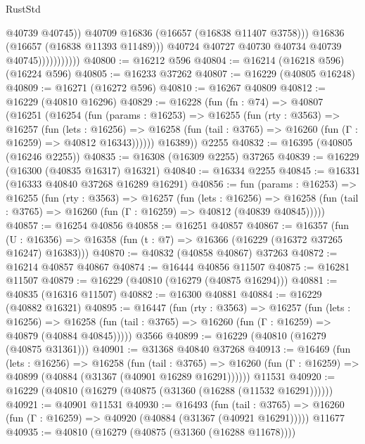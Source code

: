 \begin{lexlean}{RustStd}
\begin{coremodule}
                                  @40739
                                  @40745))
                              @40709
                              @16836
                              (@16657 (@16838 @11407 @3758)))
                            @16836
                            (@16657 (@16838 @11393 @11489)))
                          @40724
                          @40727
                          @40730
                          @40734
                          @40739
                          @40745)))))))))))
@40800 := @16212 @596
@40804 := @16214 (@16218 @596) (@16224 @596)
@40805 := @16233 @37262
@40807 := @16229 (@40805 @16248)
@40809 := @16271 (@16272 @596)
@40810 := @16267 @40809
@40812 := @16229 (@40810 @16296)
@40829 := @16228
    (fun (fn : @74) =>
    @40807
      (@16251
        (@16254
          (fun (params : @16253) =>
          @16255
            (fun (rty : @3563) =>
            @16257
              (fun (lets : @16256) =>
              @16258 (fun (tail : @3765) => @16260 (fun (Γ : @16259) => @40812 @16343))))))
        @16389))
    @2255
@40832 := @16395 (@40805 (@16246 @2255))
@40835 := @16308 (@16309 @2255) @37265
@40839 := @16229 (@16300 (@40835 @16317) @16321)
@40840 := @16334 @2255
@40845 := @16331 (@16333 @40840 @37268 @16289 @16291)
@40856 := fun (params : @16253) =>
  @16255
    (fun (rty : @3563) =>
    @16257
      (fun (lets : @16256) =>
      @16258 (fun (tail : @3765) => @16260 (fun (Γ : @16259) => @40812 (@40839 @40845)))))
@40857 := @16254 @40856
@40858 := @16251 @40857
@40867 := @16357
    (fun (U : @16356) => @16358 (fun (t : @7) => @16366 (@16229 (@16372 @37265 @16247) @16383)))
@40870 := @40832 (@40858 @40867) @37263
@40872 := @16214 @40857 @40867
@40874 := @16444 @40856 @11507
@40875 := @16281 @11507
@40879 := @16229 (@40810 (@16279 (@40875 @16294)))
@40881 := @40835 (@16316 @11507)
@40882 := @16300 @40881
@40884 := @16229 (@40882 @16321)
@40895 := @16447
    (fun (rty : @3563) =>
    @16257
      (fun (lets : @16256) =>
      @16258 (fun (tail : @3765) => @16260 (fun (Γ : @16259) => @40879 (@40884 @40845)))))
    @3566
@40899 := @16229 (@40810 (@16279 (@40875 @31361)))
@40901 := @31368 @40840 @37268
@40913 := @16469
    (fun (lets : @16256) =>
    @16258
      (fun (tail : @3765) =>
      @16260 (fun (Γ : @16259) => @40899 (@40884 (@31367 (@40901 @16289 @16291))))))
    @11531
@40920 := @16229 (@40810 (@16279 (@40875 (@31360 (@16288 (@11532 @16291))))))
@40921 := @40901 @11531
@40930 := @16493
    (fun (tail : @3765) => @16260 (fun (Γ : @16259) => @40920 (@40884 (@31367 (@40921 @16291)))))
    @11677
@40935 := @40810 (@16279 (@40875 (@31360 (@16288 @11678))))

\end{coremodule}
\end{lexlean}
